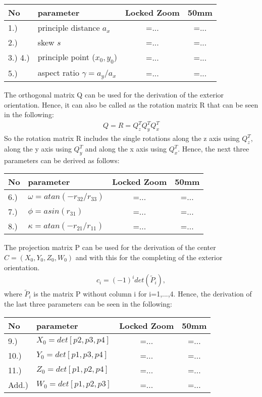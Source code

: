\documentclass[a4paper,headings=small]{scrartcl}
\numberwithin{equation}{section} %
\numberwithin{figure}{section}   %
\begin{document}
\begin{tabular}{ l l || c || c}
      No & parameter & Locked Zoom & 50mm \\
      \hline
      1.) & principle distance $a_x$ & =... &  =... \\
      2.) & skew $s$ & =... &  =...   \\
      3.)  4.) & principle point ($x_0, y_0$) & =... & =...\\
      5.) & aspect ratio $\gamma=a_y/a_x$ & =... &  =... 
\end{tabular}

The orthogonal matrix Q can be used for the derivation of the exterior orientation.
Hence, it can also be called as the rotation matrix R that can be seen in the following:
\begin{align}
Q=R=Q_z^TQ_y^TQ_x^T 
\end{align}
So the rotation matrix R includes the single rotations along the z axis using $Q_z^T$,
along the y axis using $Q_y^T$ and along the x axis using $Q_x^T$.
Hence, the next three parameters can be derived as follows:

\begin{tabular}{ l l || c || c}
      No & parameter & Locked Zoom & 50mm \\
      \hline
      6.) & $\omega=atan(-r_{32}/r_{33})$ & =... &  =... \\
      7.) & $\phi=asin(r_{31})$ & =... &  =...  \\
      8.) & $\kappa=atan(-r_{21}/r_{11})$ & =... & =...
\end{tabular}

The projection matrix P can be used for the derivation of the center $C=(X_0,Y_0,Z_0,W_0)$
and with this for the completing of the exterior orientation.
\begin{align}
c_i=(-1)^i det(\tilde{P}_i), 
\end{align}
where $\tilde{P}_i$ is the matrix P without column i for i=1,...,4.
Hence, the derivation of the last three parameters can be seen in the following:

\begin{tabular}{ l l || c || c}
      No & parameter & Locked Zoom & 50mm \\
      \hline
      9.) & $X_0=det[p2,p3,p4]$ & =... &  =... \\
      10.) & $Y_0=det[p1,p3,p4]$ & =... &  =...  \\
      11.) & $Z_0=det[p1,p2,p4]$ & =... & =...\\
      Add.) & $W_0=det[p1,p2,p3]$ & =... & =...
\end{tabular}
\end{document}

